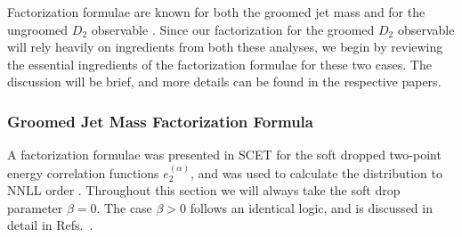 \documentclass[a4paper,11pt]{article}
\newcommand{\ecf}[2]{e_{#1}^{(#2)}}
\DeclareRobustCommand{\Refs}[1]{Refs.~\cite{#1}}
\begin{document}
Factorization formulae are known for both the groomed jet mass \cite{Frye:2016okc,Frye:2016aiz} and for the ungroomed $D_2$ observable \cite{Larkoski:2015kga}. Since our factorization for the groomed $D_2$ observable will rely heavily on ingredients from both these analyses, we begin by reviewing the essential ingredients of the factorization formulae for these two cases. The discussion will be brief, and more details can be found in the respective papers.

\subsubsection{Groomed Jet Mass Factorization Formula}\label{sec:fact_review_sdmass}

A factorization formulae was presented in SCET for the soft dropped two-point energy correlation functions $\ecf{2}{\alpha}$, and was used to calculate the distribution to NNLL order \cite{Frye:2016okc,Frye:2016aiz}.  Throughout this section we will always take the soft drop parameter $\beta=0$. The case $\beta >0$ follows an identical logic, and is discussed in detail in \Refs{Frye:2016okc,Frye:2016aiz}.
\end{document}
